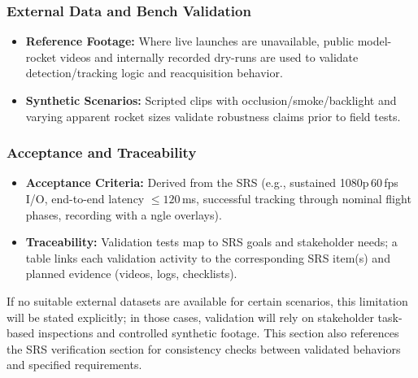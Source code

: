 \documentclass[12pt, titlepage]{article}
\begin{document}
\subsubsection*{External Data and Bench Validation}
\begin{itemize}
  \item \textbf{Reference Footage:} Where live launches are unavailable, 
  public model-rocket videos and internally recorded dry-runs are used 
  to validate detection/tracking logic and reacquisition behavior.
  \item \textbf{Synthetic Scenarios:} Scripted clips with 
  occlusion/smoke/backlight and varying apparent rocket sizes validate 
  robustness claims prior to field tests.
\end{itemize}

\subsubsection*{Acceptance and Traceability}
\begin{itemize}
  \item \textbf{Acceptance Criteria:} Derived from the SRS (e.g., 
  sustained 1080p\,60\,fps I/O, end-to-end latency $\leq 120$\,ms, 
  successful tracking through nominal flight phases, recording with a
  ngle overlays).
  \item \textbf{Traceability:} Validation tests map to SRS goals and 
  stakeholder needs; a table links each validation activity to the 
  corresponding SRS item(s) and planned evidence (videos, logs, checklists).
\end{itemize}

\noindent
If no suitable external datasets are available for certain scenarios, 
this limitation will be stated explicitly; in those cases, validation 
will rely on stakeholder task-based inspections and controlled synthetic 
footage. This section also references the SRS verification section for 
consistency checks between validated behaviors and specified requirements.




\end{document}
